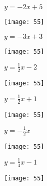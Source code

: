 \documentclass[a4paper]{oblivoir}
\begin{document}
\clearpage
\begin{minipage}{0.45\textwidth}\centering
\(y=-2x+5\)
\par\bigskip\texttt{[image: 55]}
\end{minipage}
\begin{minipage}{0.45\textwidth}\centering
\(y=-3x+3\)
\par\bigskip\texttt{[image: 55]}
\end{minipage}\bigskip\bigskip\par
\begin{minipage}{0.45\textwidth}\centering
\(y=\frac12x-2\)
\par\bigskip\texttt{[image: 55]}
\end{minipage}
\begin{minipage}{0.45\textwidth}\centering
\(y=\frac12x+1\)
\par\bigskip\texttt{[image: 55]}
\end{minipage}\bigskip\bigskip\par
\begin{minipage}{0.45\textwidth}\centering
\(y=-\frac12x\)
\par\bigskip\texttt{[image: 55]}
\end{minipage}
\begin{minipage}{0.45\textwidth}\centering
\(y=\frac13x-1\)
\par\bigskip\texttt{[image: 55]}
\end{minipage}\bigskip\bigskip\par
\end{document}
